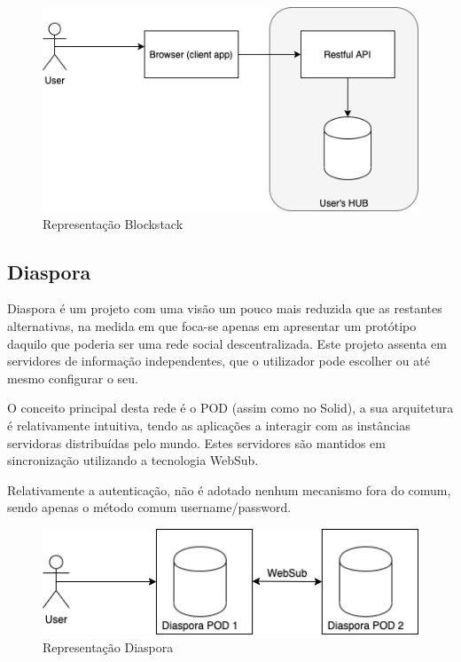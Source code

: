 \begin{figure}[h]
    \begin{center}
    \includegraphics[width=1\textwidth]{figures/estado_arte-Blockstack.png}
    \caption{Representação Blockstack}
    \end{center}
\end{figure}

\subsection{Diaspora}
Diaspora é um projeto com uma visão um pouco mais reduzida que as restantes alternativas, na medida em que foca-se apenas em apresentar um protótipo daquilo que poderia ser uma rede social descentralizada. Este projeto assenta em servidores de informação independentes, que o utilizador pode escolher ou até mesmo configurar o seu. \cite{diaspora_wiki}

O conceito principal desta rede é o POD (assim como no Solid), a sua arquitetura é relativamente intuitiva, tendo as aplicações a interagir com as instâncias servidoras distribuídas pelo mundo. Estes servidores são mantidos em sincronização utilizando a tecnologia WebSub. \cite{diaspora_wiki}

Relativamente a autenticação, não é adotado nenhum mecanismo fora do comum, sendo apenas o método comum username/password.

\begin{figure}[h]
    \begin{center}
    \includegraphics[width=1\textwidth]{figures/estado_arte-Diaspora.png}
    \caption{Representação Diaspora}
    \end{center}
\end{figure}

